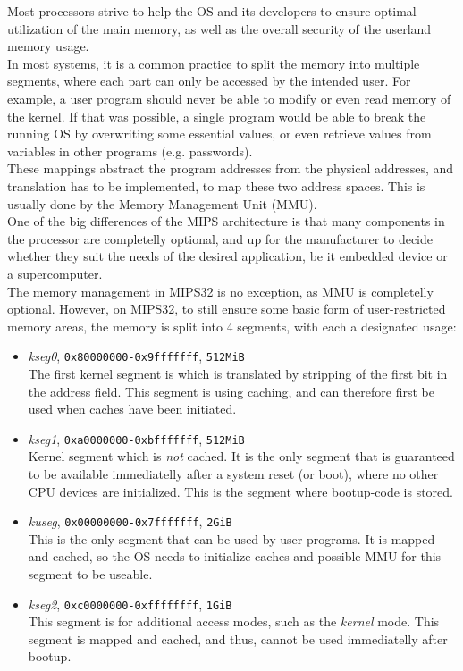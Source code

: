 \label{sec:mmu}
Most processors strive to help the OS and its developers to ensure optimal
utilization of the main memory, as well as the overall security of the userland
memory usage.\\
In most systems, it is a common practice to split the memory into multiple
segments, where each part can only be accessed by the intended user. For example,
a user program should never be able to modify or even read memory of the kernel.
If that was possible, a single program would be able to break the running OS by
overwriting some essential values, or even retrieve values from variables in
other programs (e.g. passwords).\\
These mappings abstract the program addresses from the physical addresses, and
translation has to be implemented, to map these two address spaces. This is
usually done by the Memory Management Unit (MMU).\\
One of the big differences of the MIPS architecture is that many components in
the processor are completelly optional, and up for the manufacturer to decide
whether they suit the needs of the desired application, be it embedded device
or a supercomputer\cite{imgtec:pra}.\\
The memory management in MIPS32 is no exception, as MMU is completelly optional.
However, on MIPS32, to still ensure some basic form of user-restricted memory areas, the
memory is split into 4 segments, with each a designated
usage:\cite{imgtec:Memory_Map}\cite{see_mips_run}
\begin{itemize}
\item \textit{kseg0}, \texttt{0x80000000-0x9fffffff}, \texttt{512MiB}\\
The first kernel segment is which is translated by stripping of the first bit
in the address field. This segment is using caching, and can therefore first
be used when caches have been initiated\cite{see_mips_run}.
\item \textit{kseg1}, \texttt{0xa0000000-0xbfffffff}, \texttt{512MiB}\\
Kernel segment which is \textit{not} cached. It is the only segment that is
guaranteed to be available immediatelly after a system reset (or boot), where
no other CPU devices are initialized.
This is the segment where bootup-code is stored.
\item \textit{kuseg}, \texttt{0x00000000-0x7fffffff}, \texttt{2GiB}\\
This is the only segment that can be used by user programs. It is mapped and
cached, so the OS needs to initialize caches and possible MMU for this segment
to be useable.
\item \textit{kseg2}, \texttt{0xc0000000-0xffffffff}, \texttt{1GiB}\\
This segment is for additional access modes, such as the \textit{kernel}
mode. This segment is mapped and cached, and thus, cannot be used immediatelly after
bootup.
\end{itemize}

